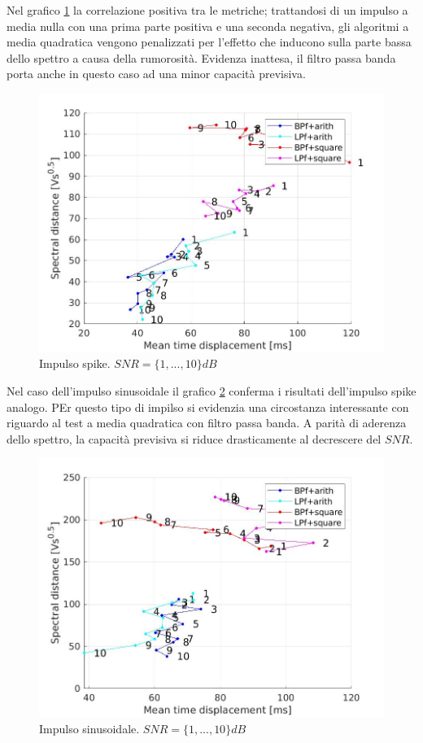 \documentclass[9pt,twocolumn,twoside]{osajnl}
\begin{document}
Nel grafico \ref{fig:scatter4} la correlazione positiva tra le metriche; trattandosi di un impulso a media nulla con una prima parte positiva e una seconda negativa, gli algoritmi a media quadratica vengono penalizzati per l'effetto che inducono sulla parte bassa dello spettro a causa della rumorosità.
Evidenza inattesa, il filtro passa banda porta anche in questo caso ad una minor capacità previsiva.

\begin{figure}[htbp]
\centering
\includegraphics[width=1\linewidth]{results/scatter4.jpg}
\caption{Impulso spike. $SNR= \{1, ..., 10\}dB$}
\label{fig:scatter4}
\end{figure}

Nel caso dell'impulso sinusoidale il grafico \ref{fig:scatter5} conferma i risultati dell'impulso spike analogo.
PEr questo tipo di impilso si evidenzia una circostanza interessante con riguardo al test a media quadratica con filtro passa banda. A parità di aderenza dello spettro, la capacità previsiva si riduce drasticamente al decrescere del $SNR$.

\begin{figure}[htbp]
\centering
\includegraphics[width=1\linewidth]{results/scatter5.jpg}
\caption{Impulso sinusoidale. $SNR= \{1, ..., 10\}dB$}
\label{fig:scatter5}
\end{figure}
\end{document}
